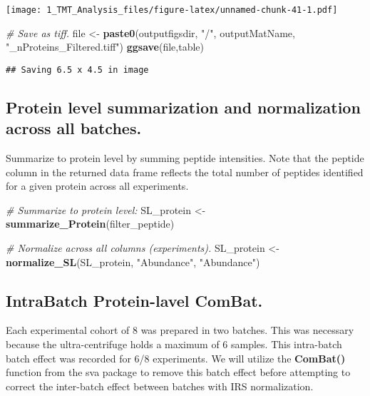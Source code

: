 \documentclass[]{article}
\newenvironment{Shaded}{\begin{snugshade}}{\end{snugshade}}
\newcommand{\KeywordTok}[1]{\textcolor[rgb]{0.13,0.29,0.53}{\textbf{#1}}}
\newcommand{\StringTok}[1]{\textcolor[rgb]{0.31,0.60,0.02}{#1}}
\newcommand{\CommentTok}[1]{\textcolor[rgb]{0.56,0.35,0.01}{\textit{#1}}}
\newcommand{\NormalTok}[1]{#1}
\begin{document}
\texttt{[image: 1\_TMT\_Analysis\_files/figure-latex/unnamed-chunk-41-1.pdf]}

\begin{Shaded}
\begin{Highlighting}[]
\CommentTok{# Save as tiff.}
\NormalTok{file <-}\StringTok{ }\KeywordTok{paste0}\NormalTok{(outputfigsdir, }\StringTok{"/"}\NormalTok{, outputMatName, }\StringTok{"_nProteins_Filtered.tiff"}\NormalTok{)}
\KeywordTok{ggsave}\NormalTok{(file,table)}
\end{Highlighting}
\end{Shaded}

\begin{verbatim}
## Saving 6.5 x 4.5 in image
\end{verbatim}

\subsection{Protein level summarization and normalization across all
batches.}\label{protein-level-summarization-and-normalization-across-all-batches.}

Summarize to protein level by summing peptide intensities. Note that the
peptide column in the returned data frame reflects the total number of
peptides identified for a given protein across all experiments.

\begin{Shaded}
\begin{Highlighting}[]
\CommentTok{# Summarize to protein level:}
\NormalTok{SL_protein <-}\StringTok{ }\KeywordTok{summarize_Protein}\NormalTok{(filter_peptide)}

\CommentTok{# Normalize across all columns (experiments).}
\NormalTok{SL_protein <-}\StringTok{ }\KeywordTok{normalize_SL}\NormalTok{(SL_protein, }\StringTok{"Abundance"}\NormalTok{, }\StringTok{"Abundance"}\NormalTok{)}
\end{Highlighting}
\end{Shaded}

\subsection{IntraBatch Protein-lavel
ComBat.}\label{intrabatch-protein-lavel-combat.}

Each experimental cohort of 8 was prepared in two batches. This was
necessary because the ultra-centrifuge holds a maximum of 6 samples.
This intra-batch batch effect was recorded for 6/8 experiments. We will
utilize the \textbf{ComBat()} function from the sva package to remove
this batch effect before attempting to correct the inter-batch effect
between batches with IRS normalization.
\end{document}
